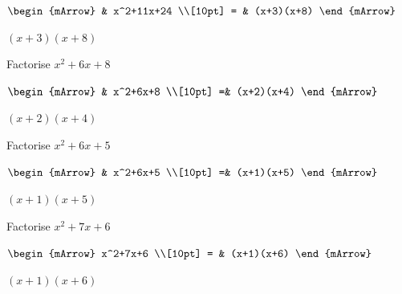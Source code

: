 \begin{mtask}[resume]
\begin{exercise}
\begin{envSolution}
			      $\begin{mArrow}
			           & x^2+11x+24                      \\[10pt]    
					 = & (x+3)(x+8) 
				 \end{mArrow}$
                 \begin{shortsolution}  
				       $(x+3)(x+8)$
			     \end{shortsolution}				 
               \end{envSolution}
         \end{exercise}

   \task \begin{exercise} Factorise $x^2+6x+8$\\
             \begin{envSolution}
			      
			      $\begin{mArrow}
			           & x^2+6x+8             \\[10pt]  
                       =& (x+2)(x+4)   					   
				 \end{mArrow}$
                 \begin{shortsolution}  
				       $(x+2)(x+4)$
			     \end{shortsolution}				 
               \end{envSolution}
         \end{exercise}

   \task \begin{exercise} Factorise $x^2+6x+5$\\
             \begin{envSolution}
			      
			      $\begin{mArrow}
			        & x^2+6x+5                     \\[10pt]    
					=& (x+1)(x+5)
				 \end{mArrow}$
                 \begin{shortsolution}  
				       $(x+1)(x+5)$
			     \end{shortsolution}				 
               \end{envSolution}
         \end{exercise}

   \task \begin{exercise} Factorise $x^2+7x+6$\\
             \begin{envSolution}
			      $\begin{mArrow}
			             x^2+7x+6  \\[10pt]    
					= & (x+1)(x+6)
				 \end{mArrow}$
                 \begin{shortsolution}  
				       $(x+1)(x+6)$
			     \end{shortsolution}				 
               \end{envSolution}
         \end{exercise}


\end{mtask}
